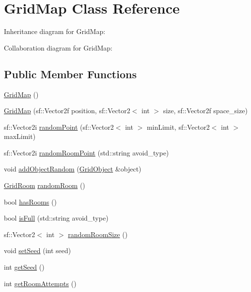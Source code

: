 \hypertarget{classGridMap}{}\section{Grid\+Map Class Reference}
\label{classGridMap}


Inheritance diagram for Grid\+Map\+:


Collaboration diagram for Grid\+Map\+:
\subsection*{Public Member Functions}
\begin{DoxyCompactItemize}
\item 
\hyperlink{classGridMap_a4a40d6c23a1abd369140225bd9419257}{Grid\+Map} ()
\item 
\hyperlink{classGridMap_adff61567702379174f38423d5fd7cb7b}{Grid\+Map} (sf\+::\+Vector2f position, sf\+::\+Vector2$<$ int $>$ size, sf\+::\+Vector2f space\+\_\+size)
\item 
sf\+::\+Vector2i \hyperlink{classGridMap_ad2a74670b88ffbe198080f4bfa23723d}{random\+Point} (sf\+::\+Vector2$<$ int $>$ min\+Limit, sf\+::\+Vector2$<$ int $>$ max\+Limit)
\item 
sf\+::\+Vector2i \hyperlink{classGridMap_ae44e3afa62e46f8027c39cdf5d1b93e6}{random\+Room\+Point} (std\+::string avoid\+\_\+type)
\item 
void \hyperlink{classGridMap_a537b2e49311be0d2bf192a11ad9ef00a}{add\+Object\+Random} (\hyperlink{classGridObject}{Grid\+Object} \&object)
\item 
\hyperlink{classGridRoom}{Grid\+Room} \hyperlink{classGridMap_af9fe47e5d5cdcceb5f1ebe2913be5b92}{random\+Room} ()
\item 
bool \hyperlink{classGridMap_a95c42d50d66b1c391cc3ed6b0d1df216}{has\+Rooms} ()
\item 
bool \hyperlink{classGridMap_a7413b5a887d323f9bda82e1fa036ffaf}{is\+Full} (std\+::string avoid\+\_\+type)
\item 
sf\+::\+Vector2$<$ int $>$ \hyperlink{classGridMap_af4625367cc720a2c101ea238ffd79644}{random\+Room\+Size} ()
\item 
void \hyperlink{classGridMap_a470864ae50feb66b442e1efbbdcbef7f}{set\+Seed} (int seed)
\item 
int \hyperlink{classGridMap_a16201950aec7a6161426c99cf684e656}{get\+Seed} ()
\item 
int \hyperlink{classGridMap_a3eae29defbaa295560dc9eac799da463}{get\+Room\+Attempts} ()

\end{DoxyCompactItemize}
